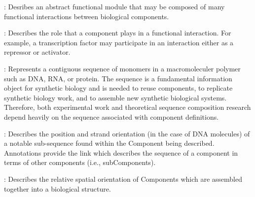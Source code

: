 \begin{description}
\item \emph{}:
Desribes an abstract functional module that may be composed of many functional interactions between biological components.

\item \emph{}:
Describes the role that a component plays in a functional interaction.  For example, a transcription factor may participate in an interaction either as a repressor or activator.

\item \emph{}:
Represents a contiguous sequence of monomers in a macromoleculer polymer such as DNA, RNA, or protein. The
sequence is a fundamental information object for synthetic biology and is needed to reuse components, to replicate synthetic biology work, and to assemble new synthetic biological systems. Therefore, both experimental work and theoretical sequence composition research depend heavily on the sequence associated with component definitions.

\item \emph{}:
Describes the position and strand orientation (in the case of DNA molecules) of a notable sub-sequence found within the Component being
described. Annotations provide the link which describes the 
sequence of a component in terms of other components (i.e.,
subComponents).

\item \emph{}:
Describes the relative spatial orientation of Components which are assembled together into a biological structure.

\end{description}